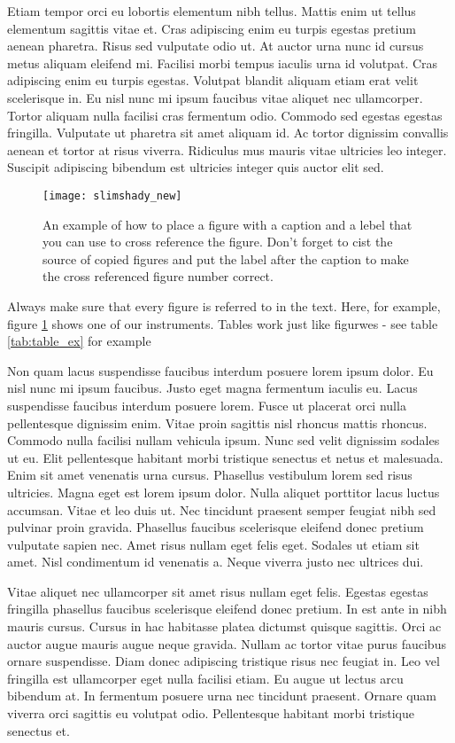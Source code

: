 Etiam tempor orci eu lobortis elementum nibh tellus. Mattis enim ut tellus elementum sagittis vitae et. Cras adipiscing enim eu turpis egestas pretium aenean pharetra. Risus sed vulputate odio ut. At auctor urna nunc id cursus metus aliquam eleifend mi. Facilisi morbi tempus iaculis urna id volutpat. Cras adipiscing enim eu turpis egestas. Volutpat blandit aliquam etiam erat velit scelerisque in. Eu nisl nunc mi ipsum faucibus vitae aliquet nec ullamcorper. Tortor aliquam nulla facilisi cras fermentum odio. Commodo sed egestas egestas fringilla. Vulputate ut pharetra sit amet aliquam id. Ac tortor dignissim convallis aenean et tortor at risus viverra. Ridiculus mus mauris vitae ultricies leo integer. Suscipit adipiscing bibendum est ultricies integer quis auctor elit sed.

\begin{figure}
	\centering
	\texttt{[image: slimshady\_new]}
	\caption{An example of how to place a figure with a caption and a lebel that you can use to cross reference the figure. Don't forget to cist the source of copied figures \cite{Batley2015} and put the label after the caption to make the cross referenced figure number correct.}
	\label{fig:fig_label}
\end{figure}

Always make sure that every figure is referred to in the text. Here, for example, figure \ref{fig:fig_label} shows one of our instruments. Tables work just like figurwes - see table \ref{tab:table_ex} for example

Non quam lacus suspendisse faucibus interdum posuere lorem ipsum dolor. Eu nisl nunc mi ipsum faucibus. Justo eget magna fermentum iaculis eu. Lacus suspendisse faucibus interdum posuere lorem. Fusce ut placerat orci nulla pellentesque dignissim enim. Vitae proin sagittis nisl rhoncus mattis rhoncus. Commodo nulla facilisi nullam vehicula ipsum. Nunc sed velit dignissim sodales ut eu. Elit pellentesque habitant morbi tristique senectus et netus et malesuada. Enim sit amet venenatis urna cursus. Phasellus vestibulum lorem sed risus ultricies. Magna eget est lorem ipsum dolor. Nulla aliquet porttitor lacus luctus accumsan. Vitae et leo duis ut. Nec tincidunt praesent semper feugiat nibh sed pulvinar proin gravida. Phasellus faucibus scelerisque eleifend donec pretium vulputate sapien nec. Amet risus nullam eget felis eget. Sodales ut etiam sit amet. Nisl condimentum id venenatis a. Neque viverra justo nec ultrices dui.

Vitae aliquet nec ullamcorper sit amet risus nullam eget felis. Egestas egestas fringilla phasellus faucibus scelerisque eleifend donec pretium. In est ante in nibh mauris cursus. Cursus in hac habitasse platea dictumst quisque sagittis. Orci ac auctor augue mauris augue neque gravida. Nullam ac tortor vitae purus faucibus ornare suspendisse. Diam donec adipiscing tristique risus nec feugiat in. Leo vel fringilla est ullamcorper eget nulla facilisi etiam. Eu augue ut lectus arcu bibendum at. In fermentum posuere urna nec tincidunt praesent. Ornare quam viverra orci sagittis eu volutpat odio. Pellentesque habitant morbi tristique senectus et.

